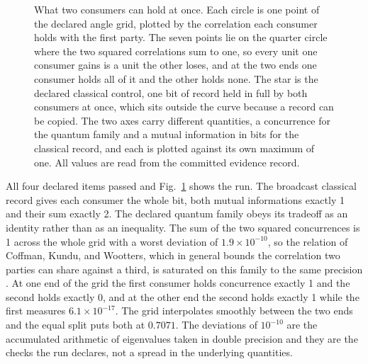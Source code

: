 \documentclass[aps,pre,reprint,nofootinbib]{revtex4-2}
\begin{document}
\begin{figure}[t]
\centering
{}
\caption{What two consumers can hold at once.  Each circle is one
point of the declared angle grid, plotted by the correlation each
consumer holds with the first party.  The seven points lie on the
quarter circle where the two squared correlations sum to one, so every
unit one consumer gains is a unit the other loses, and at the two ends
one consumer holds all of it and the other holds none.  The star is
the declared classical control, one bit of record held in full by both
consumers at once, which sits outside the curve because a record can
be copied.  The two axes carry different quantities, a concurrence for
the quantum family and a mutual information in bits for the classical
record, and each is plotted against its own maximum of one.  All
values are read from the committed evidence record.}
\label{fig:cr7}
\end{figure}

All four declared items passed and Fig.~\ref{fig:cr7} shows the run.
The broadcast classical record gives each consumer the whole bit, both
mutual informations exactly 1 and their sum exactly 2.  The declared
quantum family obeys its tradeoff as an identity rather than as an
inequality.  The sum of the two squared concurrences is 1 across the
whole grid with a worst deviation of $1.9 \times 10^{-10}$, so the
relation of Coffman, Kundu, and Wootters, which in general bounds the
correlation two parties can share against a third, is saturated on
this family to the same precision \cite{CKW2000}.  At one end of the
grid the first consumer holds concurrence exactly 1 and the second
holds exactly 0, and at the other end the second holds exactly 1 while
the first measures $6.1 \times 10^{-17}$.  The grid interpolates
smoothly between the two ends and the equal split puts both at
$0.7071$.  The deviations of $10^{-10}$ are the accumulated arithmetic
of eigenvalues taken in double precision and they are the checks the
run declares, not a spread in the underlying quantities.
\end{document}
